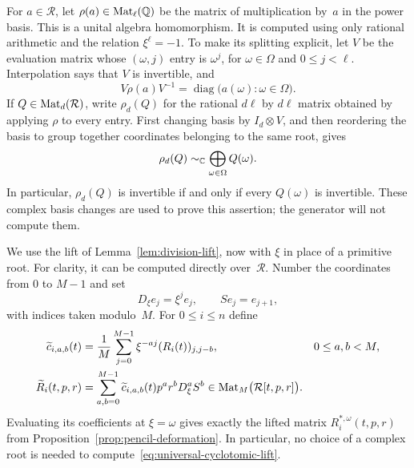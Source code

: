 For $a\in\mathcal R$, let $\rho(a)\in\operatorname{Mat}_\ell(\mathbb Q)$ be the matrix of
multiplication by~$a$ in the power basis. This is a unital algebra
homomorphism. It is computed using only rational arithmetic and the
relation $\xi^\ell=-1$. To make its splitting explicit, let $V$ be the
evaluation matrix whose $(\omega,j)$ entry is $\omega^j$, for
$\omega\in\Omega$ and $0\le j<\ell$. Interpolation says that $V$ is
invertible, and
\begin{equation}
  V\rho(a)V^{-1}
    =\operatorname{diag}\bigl(a(\omega):\omega\in\Omega\bigr).
  \label{eq:regular-representation-splitting}
\end{equation}
If $Q\in\operatorname{Mat}_d(\mathcal R)$, write $\rho_d(Q)$ for the rational
$d\ell$ by $d\ell$ matrix obtained by applying $\rho$ to every entry.
First changing basis by $I_d\otimes V$, and then reordering the basis
to group together coordinates belonging to the same root, gives
\begin{equation}
  \rho_d(Q)\sim_{\mathbb C}
    \bigoplus_{\omega\in\Omega}Q(\omega).
  \label{eq:matrix-regular-splitting}
\end{equation}
In particular, $\rho_d(Q)$ is invertible if and only if every
$Q(\omega)$ is invertible. These complex basis changes are used to
prove this assertion; the generator will not compute them.

We use the lift of Lemma~\ref{lem:division-lift}, now with $\xi$ in
place of a primitive root. For clarity, it can be computed directly
over~$\mathcal R$. Number the coordinates from $0$ to $M-1$ and set
\[
  D_\xi e_j=\xi^j e_j,\qquad Se_j=e_{j+1},
\]
with indices taken modulo~$M$. For $0\le i\le n$ define
\begin{align}
  \widetilde c_{i,a,b}(t)
    &=\frac1M\sum_{j=0}^{M-1}
          \xi^{-aj}(R_i(t))_{j,j-b},
       &&0\le a,b<M,\notag\\
  \widetilde R_i(t,p,r)
    &=\sum_{a,b=0}^{M-1}
          \widetilde c_{i,a,b}(t)p^a r^bD_\xi^aS^b
       \in\operatorname{Mat}_M\bigl(\mathcal R[t,p,r]\bigr).
  \label{eq:universal-cyclotomic-lift}
\end{align}
Evaluating its coefficients at $\xi=\omega$ gives exactly the lifted
matrix $R_i^{*,\omega}(t,p,r)$ from
Proposition~\ref{prop:pencil-deformation}. In particular, no choice of
a complex root is needed to compute~\eqref{eq:universal-cyclotomic-lift}.

